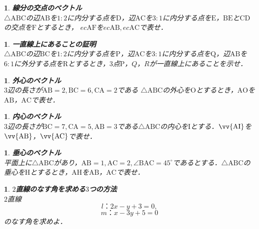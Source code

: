 \documentclass[10pt,
fleqn,
dvipdfmx,
uplatex
]{jsarticle}
\newtheorem{question}[Question]{}
\begin{document}
\begin{question}{\bf\boldmath 線分の交点のベクトル}\\
$\triangle \text{ABC}$の辺$\text{AB}$を$1:2$に内分する点を$\text{D}$，辺$\text{AC}$を$3:1$に内分する点を$\text{E}$，$\text{BE}$と$\text{CD}$の交点を$\text{F}$とするとき，
$ec{\text{AF}}$を$ec{\text{AB}}, ec{\text{AC}}$で表せ．
\end{question}



\begin{question}{\bf\boldmath 一直線上にあることの証明}\\
$\triangle \text{ABC}$の辺$\text{BC}$を$1:2$に内分する点を$\text{P}$，辺$\text{AC}$を$3:1$に内分する点を$\text{Q}$，辺$\text{AB}$を$6:1$に外分する点を$\text{R}$とするとき，$3$点$\text{P}$，$Q$，$R$が一直線上にあることを示せ．
\end{question}



\begin{question}{\bf\boldmath 外心のベクトル}\\
$3$辺の長さが$\text{AB}=2, \text{BC}=6, \text{CA}=2$である
$\triangle \text{ABC}$の外心を$\text{O}$とするとき，$\text{AO}$を$\text{AB}$，$\text{AC}$で表せ．
\end{question}



\begin{question}{\bf\boldmath 内心のベクトル}\\
$3$辺の長さが$\text{BC}=7, \text{CA}=5, \text{AB}=3$である$\triangle \text{ABC}$の内心を$\text{I}$とする．$\vv{\text{AI}}$を$\vv{\text{AB}}$，$\vv{\text{AC}}$で表せ．
\end{question}



\begin{question}{\bf\boldmath 垂心のベクトル}\\
平面上に$\triangle \text{ABC}$があり，$\text{AB}=1, \text{AC}=2, \angle \text{BAC}={45}^\circ$であるとする．$\triangle \text{ABC}$の垂心を$\text{H}$とするとき，$\text{AH}$を$\text{AB}$，$\text{AC}$で表せ．
\end{question}



\begin{question}{\bf\boldmath $2$直線のなす角を求める$3$つの方法}\\
$2$直線
\[l：2x-y+3=0, \]
\[m：x-3y+5=0\]
のなす角を求めよ．
\end{question}
\end{document}
